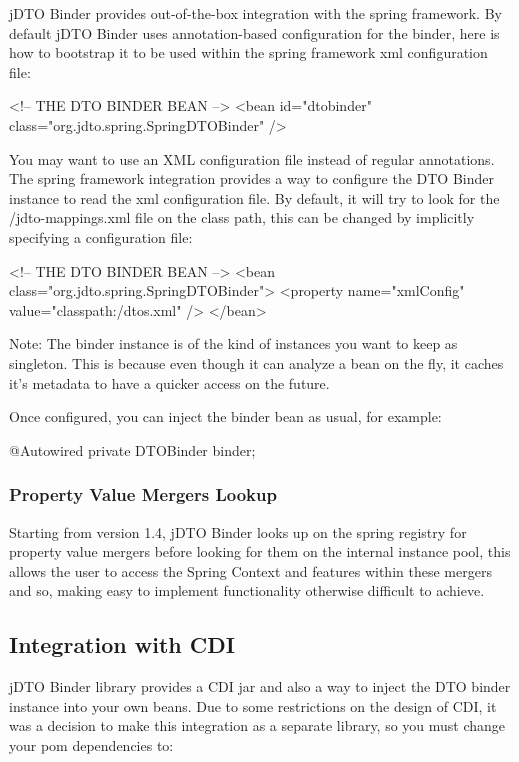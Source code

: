 \documentclass[11pt]{article}
\newcommand{\JDTO}{jDTO Binder\xspace}
\newcommand{\DEFAULTCONFIG}{/jdto-mappings.xml\xspace}
\begin{document}
\JDTO provides out-of-the-box integration with the spring framework. By default \JDTO uses annotation-based configuration for the binder, here is how to bootstrap it to be used within the spring framework xml configuration file:


\begin{xml}
<!-- THE DTO BINDER BEAN --> 
<bean id="dtobinder" 
    class="org.jdto.spring.SpringDTOBinder" />
\end{xml}


You may want to use an XML configuration file instead of regular annotations. The spring framework integration
provides a way to configure the DTO Binder instance to read the xml configuration file. By default, it will try to look for the \DEFAULTCONFIG file on the class path, this can be changed by implicitly specifying a configuration file:


\begin{xml}
<!-- THE DTO BINDER BEAN --> 
<bean class="org.jdto.spring.SpringDTOBinder">
    <property name="xmlConfig" value="classpath:/dtos.xml" />
</bean>
\end{xml}


Note: The binder instance is of the kind of instances you want to keep as singleton. This is because even though it can analyze a bean on the fly, it caches it's metadata to have a quicker access on the future.

Once configured, you can inject the binder bean as usual, for example:


\begin{java}
@Autowired
private DTOBinder binder;
\end{java}

\subsubsection{Property Value Mergers Lookup}

Starting from version 1.4, \JDTO looks up on the spring registry for property value mergers before looking for them on the internal instance pool, this allows the user to access the Spring Context and features within these mergers and so, making easy to implement functionality otherwise difficult to achieve.

\subsection{Integration with CDI}

\JDTO library provides a CDI jar and also a way to inject the DTO binder instance into your own beans. Due to some restrictions on the design of CDI, it was a decision to make this integration as a separate library, so you must change your pom dependencies to:
\end{document}
